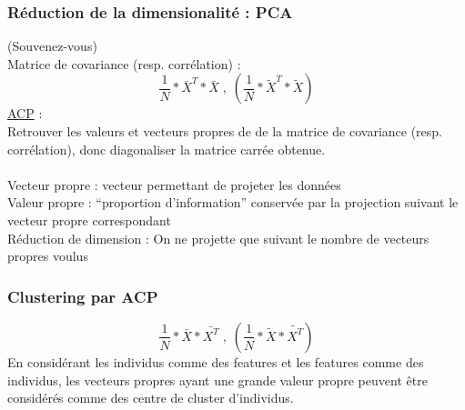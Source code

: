 
\begin{frame}
  \frametitle{Réduction de la dimensionalité : PCA}
  (Souvenez-vous) \\
  Matrice de covariance (resp. corrélation) :
  \[
  \frac{1}{N} * \bar{X}^T * \bar{X} \;,\;( \frac{1}{N} * \tilde{X}^T * \tilde{X} )
  \]
  \underline{ACP} : \\
  Retrouver les valeurs et vecteurs propres de de la matrice de covariance (resp. corrélation), donc diagonaliser la matrice carrée obtenue. \\
  \\
  Vecteur propre : vecteur permettant de projeter les données \\
  Valeur propre : ``proportion d'information'' conservée par la projection suivant le vecteur propre correspondant \\
  Réduction de dimension : On ne projette que suivant le nombre de vecteurs propres voulus
\end{frame}

\begin{frame}
  \frametitle{Clustering par ACP}
    \[
  \frac{1}{N} * \bar{X} * \bar{X^T} \;,\;( \frac{1}{N} * \tilde{X} * \tilde{X^T} )
  \]
  En considérant les individus comme des features et les features comme des individus, les vecteurs propres ayant une grande valeur propre peuvent être considérés comme des centre de cluster d'individus.
\end{frame}
